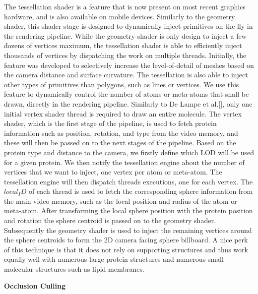 The tessellation shader is a feature that is now present on most recent graphics hardware, and is also available on mobile devices.
Similarly to the geometry shader, this shader stage is designed to dynamically inject primitives on-the-fly in the rendering pipeline.
While the geometry shader is only design to inject a few dozens of vertices maximum, the tessellation shader is able to efficiently inject thousands of vertices by dispatching the work on multiple threads.
Initially, the feature was developed to selectively increase the level-of-detail of meshes based on the camera distance and surface curvature.
The tessellation is also able to inject other types of primitives than polygons, such as lines or vertices.
We use this feature to dynamically control the number of atoms or meta-atoms that shall be drawn, directly in the rendering pipeline.
Similarly to De Lampe et al.[], only one initial vertex shader thread is required to draw an entire molecule.
The vertex shader, which is the first stage of the pipeline, is used to fetch protein information such as position, rotation, and type from the video memory, and these will then be passed on to the next stages of the pipeline.
Based on the protein type and distance to the camera, we firstly define which LOD will be used for a given protein.
We then notify the tessellation engine about the number of vertices that we want to inject, one vertex per atom or meta-atom.
The tessellation engine will then dispatch threads executions, one for each vertex.
The $local_ID$ of each thread is used to fetch the corresponding sphere information from the main video memory, such as the local position and radius of the atom or meta-atom.
After transforming the local sphere position with the protein position and rotation the sphere centroid is passed on to the geometry shader.
Subsequently the geometry shader is used to inject the remaining vertices around the sphere centroids to form the 2D camera facing sphere billboard.
A nice perk of this technique is that it does not rely on supporting structures and thus work equally well with numerous large protein structures and numerous small molecular structures such as lipid membranes.

\textbf{Occlusion Culling}


